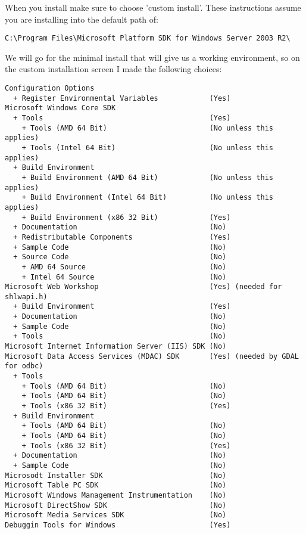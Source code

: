 When you install make sure to choose 'custom install'. These instructions 
assume you are installing into the default path of:

\begin{verbatim}
C:\Program Files\Microsoft Platform SDK for Windows Server 2003 R2\
\end{verbatim}

We will go for the minimal install that will give us a working environment, 
so on the custom installation screen I made the following choices:

\begin{verbatim}
Configuration Options
  + Register Environmental Variables            (Yes)
Microsoft Windows Core SDK
  + Tools                                       (Yes)
    + Tools (AMD 64 Bit)                        (No unless this applies)
    + Tools (Intel 64 Bit)                      (No unless this applies)
  + Build Environment
    + Build Environment (AMD 64 Bit)            (No unless this applies)
    + Build Environment (Intel 64 Bit)          (No unless this applies)
    + Build Environment (x86 32 Bit)            (Yes)
  + Documentation                               (No)
  + Redistributable Components                  (Yes)
  + Sample Code                                 (No)
  + Source Code                                 (No)
    + AMD 64 Source                             (No)
    + Intel 64 Source                           (No)
Microsoft Web Workshop                          (Yes) (needed for shlwapi.h)
  + Build Environment                           (Yes)
  + Documentation                               (No)
  + Sample Code                                 (No)
  + Tools                                       (No)
Microsoft Internet Information Server (IIS) SDK (No)
Microsoft Data Access Services (MDAC) SDK       (Yes) (needed by GDAL for odbc)
  + Tools
    + Tools (AMD 64 Bit)                        (No)
    + Tools (AMD 64 Bit)                        (No)
    + Tools (x86 32 Bit)                        (Yes)
  + Build Environment
    + Tools (AMD 64 Bit)                        (No)
    + Tools (AMD 64 Bit)                        (No)
    + Tools (x86 32 Bit)                        (Yes)
  + Documentation                               (No)
  + Sample Code                                 (No)
Microsodt Installer SDK                         (No)
Microsoft Table PC SDK                          (No)
Microsoft Windows Management Instrumentation    (No)
Microsoft DirectShow SDK                        (No)
Microsoft Media Services SDK                    (No)
Debuggin Tools for Windows                      (Yes)
\end{verbatim}

